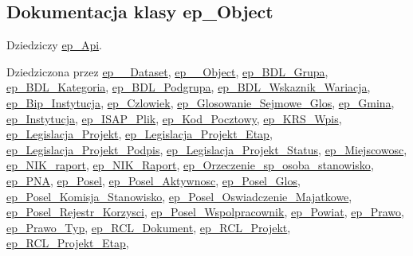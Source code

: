 \hypertarget{classep___object}{\subsection{Dokumentacja klasy ep\-\_\-\-Object}
\label{classep___object}
}


Dziedziczy \hyperlink{classep___api}{ep\-\_\-\-Api}.



Dziedziczona przez \hyperlink{classep_____dataset}{ep\-\_\-\-\_\-\-Dataset}, \hyperlink{classep_____object}{ep\-\_\-\-\_\-\-Object}, \hyperlink{classep___b_d_l___grupa}{ep\-\_\-\-B\-D\-L\-\_\-\-Grupa}, \hyperlink{classep___b_d_l___kategoria}{ep\-\_\-\-B\-D\-L\-\_\-\-Kategoria}, \hyperlink{classep___b_d_l___podgrupa}{ep\-\_\-\-B\-D\-L\-\_\-\-Podgrupa}, \hyperlink{classep___b_d_l___wskaznik___wariacja}{ep\-\_\-\-B\-D\-L\-\_\-\-Wskaznik\-\_\-\-Wariacja}, \hyperlink{classep___bip___instytucja}{ep\-\_\-\-Bip\-\_\-\-Instytucja}, \hyperlink{classep___czlowiek}{ep\-\_\-\-Czlowiek}, \hyperlink{classep___glosowanie___sejmowe___glos}{ep\-\_\-\-Glosowanie\-\_\-\-Sejmowe\-\_\-\-Glos}, \hyperlink{classep___gmina}{ep\-\_\-\-Gmina}, \hyperlink{classep___instytucja}{ep\-\_\-\-Instytucja}, \hyperlink{classep___i_s_a_p___plik}{ep\-\_\-\-I\-S\-A\-P\-\_\-\-Plik}, \hyperlink{classep___kod___pocztowy}{ep\-\_\-\-Kod\-\_\-\-Pocztowy}, \hyperlink{classep___k_r_s___wpis}{ep\-\_\-\-K\-R\-S\-\_\-\-Wpis}, \hyperlink{classep___legislacja___projekt}{ep\-\_\-\-Legislacja\-\_\-\-Projekt}, \hyperlink{classep___legislacja___projekt___etap}{ep\-\_\-\-Legislacja\-\_\-\-Projekt\-\_\-\-Etap}, \hyperlink{classep___legislacja___projekt___podpis}{ep\-\_\-\-Legislacja\-\_\-\-Projekt\-\_\-\-Podpis}, \hyperlink{classep___legislacja___projekt___status}{ep\-\_\-\-Legislacja\-\_\-\-Projekt\-\_\-\-Status}, \hyperlink{classep___miejscowosc}{ep\-\_\-\-Miejscowosc}, \hyperlink{classep___n_i_k__raport}{ep\-\_\-\-N\-I\-K\-\_\-raport}, \hyperlink{classep___n_i_k___raport}{ep\-\_\-\-N\-I\-K\-\_\-\-Raport}, \hyperlink{classep___orzeczenie__sp__osoba__stanowisko}{ep\-\_\-\-Orzeczenie\-\_\-sp\-\_\-osoba\-\_\-stanowisko}, \hyperlink{classep___p_n_a}{ep\-\_\-\-P\-N\-A}, \hyperlink{classep___posel}{ep\-\_\-\-Posel}, \hyperlink{classep___posel___aktywnosc}{ep\-\_\-\-Posel\-\_\-\-Aktywnosc}, \hyperlink{classep___posel___glos}{ep\-\_\-\-Posel\-\_\-\-Glos}, \hyperlink{classep___posel___komisja___stanowisko}{ep\-\_\-\-Posel\-\_\-\-Komisja\-\_\-\-Stanowisko}, \hyperlink{classep___posel___oswiadczenie___majatkowe}{ep\-\_\-\-Posel\-\_\-\-Oswiadczenie\-\_\-\-Majatkowe}, \hyperlink{classep___posel___rejestr___korzysci}{ep\-\_\-\-Posel\-\_\-\-Rejestr\-\_\-\-Korzysci}, \hyperlink{classep___posel___wspolpracownik}{ep\-\_\-\-Posel\-\_\-\-Wspolpracownik}, \hyperlink{classep___powiat}{ep\-\_\-\-Powiat}, \hyperlink{classep___prawo}{ep\-\_\-\-Prawo}, \hyperlink{classep___prawo___typ}{ep\-\_\-\-Prawo\-\_\-\-Typ}, \hyperlink{classep___r_c_l___dokument}{ep\-\_\-\-R\-C\-L\-\_\-\-Dokument}, \hyperlink{classep___r_c_l___projekt}{ep\-\_\-\-R\-C\-L\-\_\-\-Projekt}, \hyperlink{classep___r_c_l___projekt___etap}{ep\-\_\-\-R\-C\-L\-\_\-\-Projekt\-\_\-\-Etap}, 